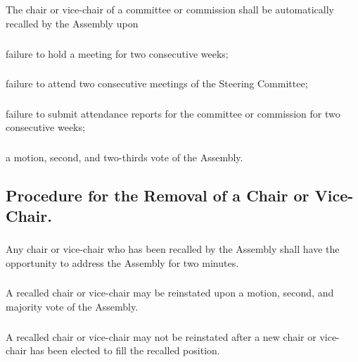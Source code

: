 \subsection{}
The chair or vice-chair of a committee or commission shall be automatically recalled by the Assembly upon

\subsubsection{}
failure to hold a meeting for two consecutive weeks;
\subsubsection{}
failure to attend two consecutive meetings of the Steering Committee;
\subsubsection{}
failure to submit attendance reports for the committee or commission for two consecutive weeks;
\subsubsection{}
a motion, second, and two-thirds vote of the Assembly.

\subsection{Procedure for the Removal of a Chair or Vice-Chair.}

\subsubsection{}
Any chair or vice-chair who has been recalled by the Assembly shall have the opportunity to address the Assembly for two minutes.

\subsubsection{}
A recalled chair or vice-chair may be reinstated upon a motion, second, and majority vote of the Assembly.

\subsubsection{}
A recalled chair or vice-chair may not be reinstated after a new chair or vice-chair has been elected to fill the recalled position. 

